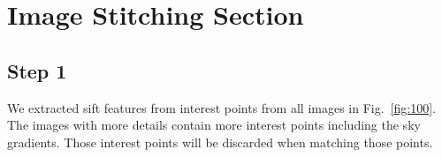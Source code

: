 \documentclass[a4paper]{iacas}
\begin{document}

\vspace{2em}

\section{Image Stitching Section}

\subsection{Step 1}

We extracted sift features from interest points from all images in Fig.~\ref{fig:100}. The images with more details contain more interest points including the sky gradients. Those interest points will be discarded when matching those points.
\end{document}
